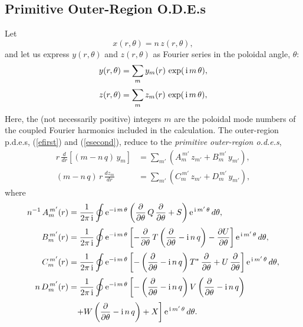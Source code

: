\documentclass[12pt,prb,aps]{revtex4-1}
\begin{document}
\subsection{Primitive Outer-Region O.D.E.s}\label{ode1}
Let
\begin{equation}\label{e79o}
x(r,\theta) = n\,z(r,\theta),
\end{equation}
and
let us express $y(r,\theta)$ and $z(r,\theta)$ as  Fourier series in the poloidal angle, $\theta$:
\begin{align}
y(r,\theta)&= \sum_{m}y_m(r)\,\exp(\,{\rm i}\,m\,\theta),\\[0.5ex]
z(r,\theta) &= \sum_{m}z_m(r)\,\exp(\,{\rm i}\,m\,\theta),\label{e97}
\end{align}
Here, the  (not necessarily positive) integers $m$ are the  poloidal mode numbers of the coupled Fourier harmonics included in the calculation. 
The outer-region p.d.e.s, (\ref{efirst}) and (\ref{esecond}),  reduce to the {\em primitive outer-region o.d.e.s},\cite{connor,am1,am3}
\begin{align}\label{e41x}
r\,\frac{d}{dr}\left[(m-n\,q)\,y_m\right]&= \sum_{m'}\left(A_m^{\,m'}\,z_{m'}+B_m^{\,m'}\,y_{m'}\right),\\[0.5ex]
(m-n\,q)\,r\,\frac{dz_m}{dr} &= \sum_{m'}\left(C_{m}^{\,m'}\,z_{m'}+D_m^{\,m'}\,y_{m'}\right),\label{e42x}
\end{align}
where
\begin{align}
n^{-1}\,A_m^{\,m'}(r) &= \frac{1}{2\pi\,{\rm i}}\oint{\rm e}^{-{\rm i}\,m\,\theta}\left(\frac{\partial}{\partial\theta}\,Q\,\frac{\partial}{\partial\theta}+S\right){\rm e}^{\,{\rm i}\,m'\,\theta}\,d\theta,\\[0.5ex]
B_m^{\,m'}(r) &= \frac{1}{2\pi\,{\rm i}}\oint{\rm e}^{-{\rm i}\,m\,\theta}\left[-\frac{\partial}{\partial\theta}\,T\left(\frac{\partial}{\partial\theta}-{\rm i}\,n\,q\right)-\frac{\partial U}{\partial\theta}\right]{\rm e}^{\,{\rm i}\,m'\,\theta}\,d\theta,\\[0.5ex]
C_m^{\,m'}(r) &= \frac{1}{2\pi\,{\rm i}}\oint{\rm e}^{-{\rm i}\,m\,\theta}\left[-\left(\frac{\partial}{\partial\theta}-{\rm i}\,n\,q\right)T^\ast\,\frac{\partial}{\partial\theta}+U\,\frac{\partial}{\partial\theta}\right]{\rm e}^{\,{\rm i}\,m'\,\theta}\,d\theta,\\[0.5ex]
n\,D_m^{\,m'}(r)&= \frac{1}{2\pi\,{\rm i}}\oint{\rm e}^{-{\rm i}\,m\,\theta}\left[-\left(\frac{\partial}{\partial\theta}-{\rm i}\,n\,q\right)V\left(\frac{\partial}{\partial\theta}-{\rm i}\,n\,q\right)
\right. \nonumber\\[0.5ex]&\phantom{=}\left.+W\left(\frac{\partial}{\partial\theta}-{\rm i}\,n\,q\right)+ X\right]{\rm e}^{\,{\rm i}\,m'\,\theta}\,d\theta.
\end{align}
\end{document}
